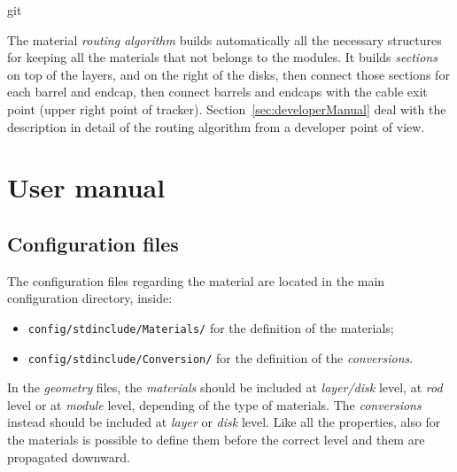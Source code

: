 git\documentclass[12pt, a4paper]{article}
\newcommand{\pat}[1]{\texttt{#1}}
\begin{document}
The material \emph{routing algorithm} builds automatically all the necessary structures for
keeping all the materials that not belongs to the modules. It builds
\emph{sections} on top of the layers, and on the right of the disks,
then connect those sections for each barrel and endcap, then connect
barrels and endcaps with the cable exit point (upper right point of
tracker). Section~\ref{sec:developerManual} deal with the description
in detail of the routing algorithm from a developer point of view.




\section{User manual}\label{sec:userManual}
\subsection{Configuration files}
The configuration files regarding the material are located in the main
configuration directory, inside:
\begin{itemize}
\item \pat{config/stdinclude/Materials/} for the definition of the
  materials;
\item \pat{config/stdinclude/Conversion/} for the definition of the
  \emph{conversions}.
\end{itemize}

In the \emph{geometry} files, the \emph{materials} should be included
at \emph{layer/disk} level, at \emph{rod} level or at \emph{module}
level, depending of the type of materials. The \emph{conversions}
instead should be included at \emph{layer} or \emph{disk} level. Like
all the properties, also for the materials is possible to define them before
the correct level and them are propagated downward.
\end{document}
